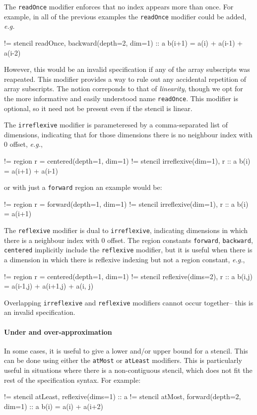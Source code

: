 \documentclass[9pt]{sigplanconf}
\theoremstyle{definition}
\newcommand{\eg}{\emph{e.g.}}
\newcommand{\term}[1]{\texttt{#1}}
\begin{document}
The \texttt{readOnce} modifier enforces that no index appears
more than once. For example, in all of the previous examples the
\texttt{readOnce} modifier could be added, \eg{}
%
\begin{ExmVerbatim}
!= stencil readOnce, backward(depth=2, dim=1) :: a
b(i+1) = a(i) + a(i-1) + a(i-2)
\end{ExmVerbatim}
%
However, this would be an invalid specification if any of the 
array subscripts was reapeated. This modifier provides a way to
 rule out any accidental repetition of array subscripts. 
The notion correponds to that of \emph{linearity}, though we
opt for the more informative and easily understood name
\texttt{readOnce}. This modifier is optional, so it need not
be present even if the stencil is linear. 

The \texttt{irreflexive} modifier is parameteresed by a
comma-separated list of dimensions, indicating that for those
dimensions there is no neighbour index with $0$ offset, \eg{}, 
%
\begin{ExmVerbatim}
!= region r = centered(depth=1, dim=1)
!= stencil irreflexive(dim=1), r :: a
b(i) = a(i+1) + a(i-1)
\end{ExmVerbatim}
%
or with just a \texttt{forward} region an example would be: 
%
\begin{ExmVerbatim}
!= region r = forward(depth=1, dim=1)
!= stencil irreflexive(dim=1), r :: a
b(i) = a(i+1)
\end{ExmVerbatim}

The \term{reflexive} modifier is dual to \term{irreflexive},
indicating dimensions in which there is a neighbour index with $0$
offset. The region constants \term{forward}, \term{backward},
\term{centered} implicitly include the \term{reflexive} modifier,
but it is useful when there is a dimension in which there is reflexive
indexing but not a region constant, \eg{},
\begin{ExmVerbatim}
!= region r = centered(depth=1, dim=1)
!= stencil reflexive(dims=2), r :: a
b(i,j) = a(i-1,j) + a(i+1,j) + a(i, j) 
\end{ExmVerbatim}
Overlapping \term{irreflexive} and \term{reflexive} modifiers
cannot occur together-- this is an invalid specification.

\paragraph{Under and over-approximation}

In some cases, it is useful to give a lower and/or upper bound for a
stencil. This can be done using either the \term{atMost} or
\term{atLeast} modifiers. This is particularly useful in situations
where there is a non-contiguous stencil, which does not fit the rest
of the specification syntax.  For example:
\begin{ExmVerbatim}
!= stencil atLeast, reflexive(dims=1)      :: a
!= stencil atMost, forward(depth=2, dim=1) :: a
b(i) = a(i) + a(i+2) 
\end{ExmVerbatim}
\end{document}
